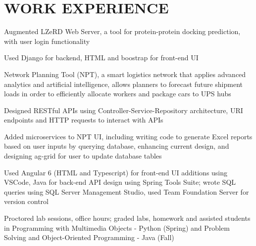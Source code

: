 \documentclass[]{deedy-resume-openfont}
\begin{document}
\begin{minipage}[t]{0.67\textwidth} 


\section{WORK EXPERIENCE}

\vspace{\topsep} %
\begin{tightemize}
\item Augmented LZeRD Web Server, a tool for protein-protein docking prediction, with user login functionality
\item Used Django for backend, HTML and boostrap for front-end UI
\end{tightemize}
\sectionsep


\begin{tightemize}
\item Network Planning Tool (NPT), a smart logistics network that applies advanced analytics and artificial intelligence, allows planners to forecast future shipment loads in order to efficiently allocate workers and package cars to UPS hubs
\item Designed RESTful APIs using Controller-Service-Repository architecture, URI endpoints and HTTP requests to interact with APIs
\item Added microservices to NPT UI, including writing code to generate Excel reports based on user inputs by querying database, enhancing current design, and designing ag-grid for user to update database tables
\item Used Angular 6 (HTML and Typescript) for front-end UI additions using VSCode, Java for back-end API design using Spring Tools Suite; wrote SQL queries using SQL Server Management Studio, used Team Foundation Server for version control
\end{tightemize}
\sectionsep

\begin{tightemize}
\item Proctored lab sessions, office hours; graded labs, homework and assisted students in Programming with Multimedia Objects - Python (Spring) and Problem Solving and Object-Oriented Programming - Java (Fall)
\end{tightemize}
\sectionsep


\end{minipage}
\end{document}

